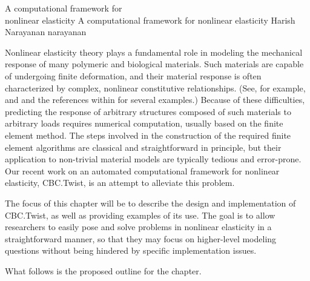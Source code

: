 \begingroup
\def\bone{{1}}
\def\Bepsilon{\mbox{$\epsilon$}}
\def\Bvarphi{\mbox{$\varphi$}}
\def\bB{\mbox{$ B$}}
\def\bC{\mbox{$ C$}}
\def\bE{\mbox{$ E$}}
\def\bF{\mbox{$ F$}}
\def\bN{\mbox{$ N$}}
\def\bP{\mbox{$ P$}}
\def\bS{\mbox{$ S$}}
\def\bT{\mbox{$ T$}}
\def\bX{\mbox{$ X$}}
\def\ba{\mbox{$ a$}}
\def\bb{\mbox{$ b$}}
\def\be{\mbox{$ e$}}
\def\bg{\mbox{$ g$}}
\def\br{\mbox{$ r$}}
\def\bu{\mbox{$ u$}}
\def\bv{\mbox{$ v$}}
\def\bw{\mbox{$ w$}}
\def\twist{CBC.Twist}

              {A computational framework for \\ nonlinear elasticity}
              {A computational framework for nonlinear elasticity}
              {Harish Narayanan}
              {narayanan}

Nonlinear elasticity theory plays a fundamental role in modeling the
mechanical response of many polymeric and biological materials. Such
materials are capable of undergoing finite deformation, and their
material response is often characterized by complex, nonlinear
constitutive relationships. (See, for example, \citet{Holzapfel2000}
and \citet{TruesdellNoll1965} and the references within for several
examples.) Because of these difficulties, predicting the response of
arbitrary structures composed of such materials to arbitrary loads
requires numerical computation, usually based on the finite element
method. The steps involved in the construction of the required finite
element algorithms are classical and straightforward in principle, but
their application to non-trivial material models are typically tedious
and error-prone. Our recent work on an automated computational
framework for nonlinear elasticity, \twist, is an attempt to alleviate
this problem.

The focus of this chapter will be to describe the design and
implementation of \twist, as well as providing examples of its
use. The goal is to allow researchers to easily pose and solve
problems in nonlinear elasticity in a straightforward manner, so that
they may focus on higher-level modeling questions without being
hindered by specific implementation issues.

What follows is the proposed outline for the chapter.

